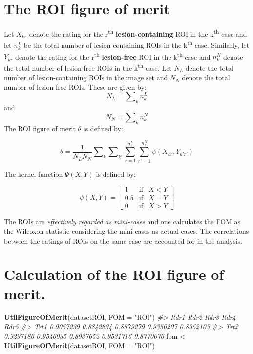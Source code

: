 \documentclass[
]{book}
\newenvironment{Shaded}{\begin{snugshade}}{\end{snugshade}}
\newcommand{\CommentTok}[1]{\textcolor[rgb]{0.56,0.35,0.01}{\textit{#1}}}
\newcommand{\DataTypeTok}[1]{\textcolor[rgb]{0.13,0.29,0.53}{#1}}
\newcommand{\KeywordTok}[1]{\textcolor[rgb]{0.13,0.29,0.53}{\textbf{#1}}}
\newcommand{\NormalTok}[1]{#1}
\newcommand{\StringTok}[1]{\textcolor[rgb]{0.31,0.60,0.02}{#1}}
\begin{document}
\hypertarget{the-roi-figure-of-merit}{%
\section{The ROI figure of merit}\label{the-roi-figure-of-merit}}

Let \({X_{kr}}\) denote the rating for the r\textsuperscript{th} \textbf{lesion-containing} ROI in the k\textsuperscript{th} case and let \(n_{k}^L\) be the total number of lesion-containing ROIs in the k\textsuperscript{th} case. Similarly, let \({Y_{kr}}\) denote the rating for the r\textsuperscript{th} \textbf{lesion-free} ROI in the k\textsuperscript{th} case and \(n_{k}^N\) denote the total number of lesion-free ROIs in the k\textsuperscript{th} case. Let \({N_L}\) denote the total number of lesion-containing ROIs in the image set and \(N_N\) denote the total number of lesion-free ROIs. These are given by:
\[N_L=\sum\nolimits_{k}{n_{k}^L}\] and \[N_N=\sum\nolimits_{k}{n_{k}^N}\]
The ROI figure of merit \(\theta\) is defined by:

\begin{equation*} 
\theta =\frac{1}{N_LN_N}\sum\nolimits_k{\sum\nolimits_{k'}{\sum\limits_{r=1}^{n_{k}^{L}}{\sum\limits_{r'=1}^{n_{k'}^{N}}{\psi (X_{kr},{Y_{k'r'}})}}}}
\end{equation*}

The kernel function \(\Psi(X,Y)\) is defined by:

\begin{equation*} 
\psi\left ( X,Y \right ) =\begin{bmatrix}
1 &    \text{if}& {X < Y}\\ 
0.5 &  \text{if}& {X = Y}\\ 
 0 &   \text{if}& {X > Y} 
\end{bmatrix}
\end{equation*}

The ROIs are \emph{effectively regarded as mini-cases} and one calculates the FOM as the Wilcoxon statistic considering the mini-cases as actual cases. The correlations between the ratings of ROIs on the same case are accounted for in the analysis.

\hypertarget{calculation-of-the-roi-figure-of-merit.}{%
\section{Calculation of the ROI figure of merit.}\label{calculation-of-the-roi-figure-of-merit.}}

\begin{Shaded}
\begin{Highlighting}[]
\KeywordTok{UtilFigureOfMerit}\NormalTok{(datasetROI, }\DataTypeTok{FOM =} \StringTok{"ROI"}\NormalTok{)}
\CommentTok{\#\textgreater{}           Rdr1      Rdr2      Rdr3      Rdr4      Rdr5}
\CommentTok{\#\textgreater{} Trt1 0.9057239 0.8842834 0.8579279 0.9350207 0.8352103}
\CommentTok{\#\textgreater{} Trt2 0.9297186 0.9546035 0.8937652 0.9531716 0.8770076}
\NormalTok{fom \textless{}{-}}\StringTok{ }\KeywordTok{UtilFigureOfMerit}\NormalTok{(datasetROI, }\DataTypeTok{FOM =} \StringTok{"ROI"}\NormalTok{)}
\end{Highlighting}
\end{Shaded}
\end{document}
